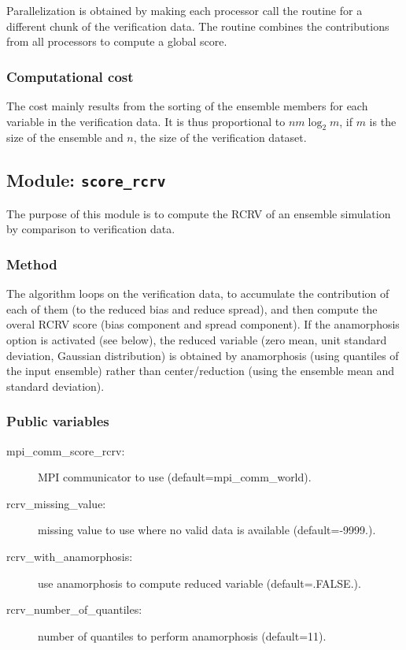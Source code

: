 \documentclass[11pt]{article}
\begin{document}
Parallelization is obtained by making each processor call the routine
for a different chunk of the verification data.
The routine combines the contributions from all processors
to compute a global score.

\subsubsection*{Computational cost}

The cost mainly results from the sorting of the ensemble members
for each variable in the verification data.
It is thus proportional to $n m \log_2 m$,
if $m$ is the size of the ensemble and $n$, the size of the verification dataset.

\subsection{Module: {\tt\bf score\_rcrv}}

The purpose of this module is to compute the RCRV
of an ensemble simulation by comparison to verification data.

\subsubsection*{Method}

The algorithm loops on the verification data,
to accumulate the contribution of each of them
(to the reduced bias and reduce spread),
and then compute the overal RCRV score
(bias component and spread component).
If the anamorphosis option is activated (see below),
the reduced variable (zero mean, unit standard deviation, Gaussian distribution)
is obtained by anamorphosis (using quantiles of the input ensemble)
rather than center/reduction (using the ensemble mean and standard deviation).

\subsubsection*{Public variables}

\begin{description}
\item[mpi\_comm\_score\_rcrv:] MPI communicator to use (default=mpi\_comm\_world).
\item[rcrv\_missing\_value:] missing value to use where no valid data is available (default=-9999.).
\item[rcrv\_with\_anamorphosis:] use anamorphosis to compute reduced variable (default=.FALSE.).
\item[rcrv\_number\_of\_quantiles:] number of quantiles to perform anamorphosis (default=11).
\end{description}
\end{document}
